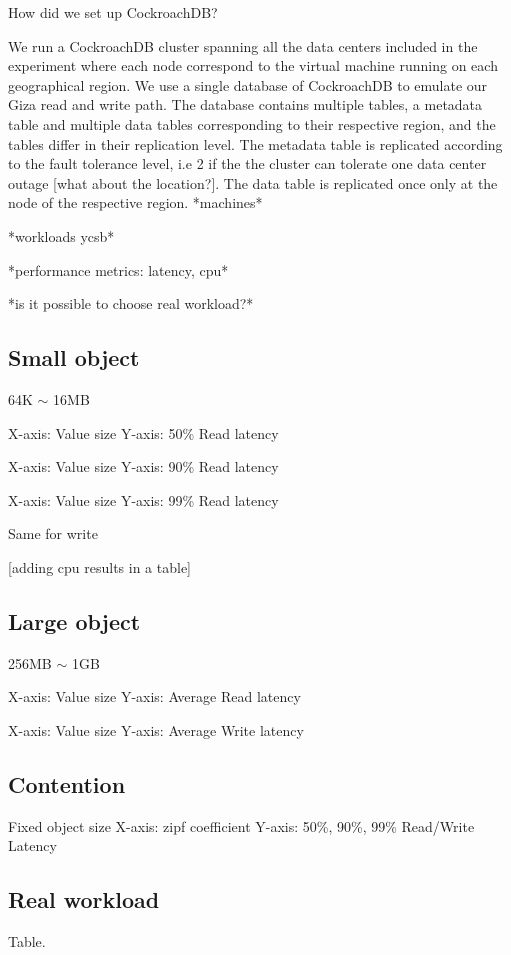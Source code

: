 How did we set up CockroachDB?

We run a CockroachDB cluster spanning all the data centers included in the experiment where each node correspond to the virtual machine running on each geographical region. We use a single database of CockroachDB to emulate our Giza read and write path. The database contains multiple tables, a metadata table and multiple data tables corresponding to their respective region, and the tables differ in their replication level. The metadata table is replicated according to the fault tolerance level, i.e 2 if the the cluster can tolerate one data center outage [what about the location?]. The data table is replicated once only at the node of the respective region.
*machines*

*workloads ycsb*

*performance metrics: latency, cpu*

*is it possible to choose real workload?*


\subsection{Small object}
64K $\sim$ 16MB

X-axis: Value size
Y-axis: 50\% Read latency

X-axis: Value size
Y-axis: 90\% Read latency

X-axis: Value size
Y-axis: 99\% Read latency

Same for write

[adding cpu results in a table]

\subsection{Large object}
256MB $\sim$ 1GB

X-axis: Value size
Y-axis: Average Read latency

X-axis: Value size
Y-axis: Average Write latency


\subsection{Contention}

Fixed object size
X-axis: zipf coefficient
Y-axis: 50\%, 90\%, 99\% Read/Write Latency


\subsection{Real workload}
Table.